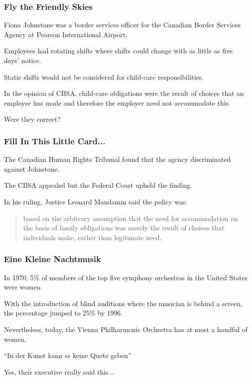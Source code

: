\begin{frame}
\frametitle{Fly the Friendly Skies}

Fiona Johnstone was a border services officer for the Canadian Border Services Agency at Pearson International Airport.

Employees had rotating shifts where shifts could change with as little as five days' notice.

Static shifts would not be considered for child-care responsibilities.

In the opinion of CBSA, child-care obligations were the result of choices that an employee has made and therefore the employer need not accommodate this.

Were they correct?

\end{frame}



\begin{frame}
\frametitle{Fill In This Little Card...}

The Canadian Human Rights Tribunal found that the agency discriminated against Johnstone.

The CBSA appealed but the Federal Court upheld the finding.

In his ruling, Justice Leonard Mandamin said the policy was:

\begin{quote}
based on the arbitrary assumption that the need for accommodation on the basis of family obligations was merely the result of choices that individuals make, rather than legitimate need.
\end{quote}


\end{frame}



\begin{frame}
\frametitle{Eine Kleine Nachtmusik}

In 1970, 5\% of members of the top five symphony orchestras in the United States were women.

	With the introduction of blind auditions where the musician is behind a screen, the percentage jumped to 25\% by 1996.

	Nevertheless, today, the Vienna Philharmonic Orchestra has at most a handful of women.

			``In der Kunst kann es keine Quote geben''

Yes, their executive really said this...


\end{frame}




